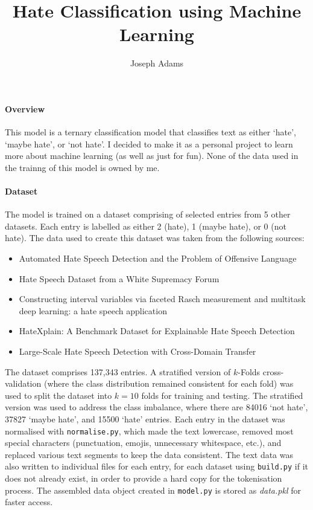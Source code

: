 \documentclass[12pt,a4paper]{article}
\title{Hate Classification using Machine Learning}
\author{Joseph Adams}
\date{}
\begin{document}
\maketitle

\paragraph{Overview} This model is a ternary classification model that classifies text as either `hate', `maybe hate', or `not hate'. I decided to make it as a personal project to learn more about machine learning (as well as just for fun). None of the data used in the trainng of this model is owned by me.

\paragraph{Dataset} The model is trained on a dataset comprising of selected entries from 5 other datasets. Each entry is labelled as either 2 (hate), 1 (maybe hate), or 0 (not hate). The data used to create this dataset was taken from the following sources:
\begin{itemize}
    \item Automated Hate Speech Detection and the Problem of Offensive Language \cite{hateoffensive}
    \item Hate Speech Dataset from a White Supremacy Forum \cite{gibert2018hate}
    \item Constructing interval variables via faceted Rasch measurement and multitask deep learning: a hate speech application \cite{kennedy2020constructing}
    \item HateXplain: A Benchmark Dataset for Explainable Hate Speech Detection \cite{mathew2021hatexplain}
    \item Large-Scale Hate Speech Detection with Cross-Domain Transfer \cite{toraman2022large}
\end{itemize}
The dataset comprises 137,343 entries. A stratified version of $k$-Folds cross-validation (where the class distribution remained consistent for each fold) was used to split the dataset into $k = 10$ folds for training and testing. The stratified version was used to address the class imbalance, where there are 84016 `not hate', 37827 `maybe hate', and 15500 `hate' entries. Each entry in the dataset was normalised with \texttt{normalise.py}, which made the text lowercase, removed most special characters (punctuation, emojis, unnecessary whitespace, etc.), and replaced various text segments to keep the data consistent. The text data was also written to individual files for each entry, for each dataset using \texttt{build.py} if it does not already exist, in order to provide a hard copy for the tokenisation process. The assembled data object created in \texttt{model.py} is stored as \textit{data.pkl} for faster access.
\end{document}
